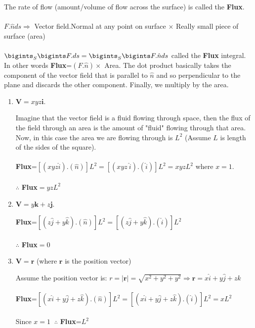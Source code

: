 \documentclass[fleqn]{article}
\begin{document}
\begin{enumerate}
      \textcolor{hwColor}{
        The rate of flow (amount/volume of flow across the surface) is called the \textbf{Flux}. \\
        \\
        $F.\hat{n} ds \Rightarrow$ Vector field.Normal at any point on surface $\times$ Really small piece of surface (area) \\ \\
        $
          \bigints_{S}\bigints F.ds=\bigints_{S} \bigints F.\hat{n} ds 
        $ called the \textbf{Flux} integral. In other words \textbf{Flux}=$(F.\hat{n}) \times$ Area. The dot product basically takes
        the component of the vector field that is parallel to $\hat{n}$ and so perpendicular to
        the plane and discards the other component. Finally, we multiply by the area. \\
      }

      \begin{enumerate}
        \item $\mathbf{V}=xyz\mathbf{i}$.

          \textcolor{hwColor}{
            Imagine that the vector field is a fluid flowing through space, then the flux of the field through an area is the amount of "fluid"
            flowing through that area. Now, in this case the area we are flowing through is $L^2$ (Assume $L$ is length of the sides of the square).
            \\
            \\
            \textbf{Flux}=$\left[(xyz \hat{i}).(\hat{n})\right] L^2=\left[(xyz ~ \hat{i}).(\hat{i})\right]L^2=xyzL^2$ where $x=1$. \\
            \\
            $\therefore$ \textbf{Flux}$=yzL^2$
          }

        \item $\mathbf{V}=y\mathbf{k}+z\mathbf{j}$.

          \textcolor{hwColor}{
            \textbf{Flux}=$\left[(z \hat{j}+y\hat{k}).(\hat{n})\right] L^2=\left[(z \hat{j}+y\hat{k}).(\hat{i})\right] L^2$ \\
            \\
            $\therefore$ \textbf{Flux}$=0$
          }

        \item $\mathbf{V}=\mathbf{r}$ (where $\mathbf{r}$ is the position vector)

          \textcolor{hwColor}{
            Assume the position vector is: $r=|\mathbf{r}|=\sqrt{x^2+y^2+y^2} \Rightarrow \mathbf{r}=x \hat{i}+y \hat{j}+z \hat{k}$ \\
            \\
            \textbf{Flux}=$\left[(x \hat{i}+y \hat{j}+z \hat{k}).(\hat{n})\right] L^2=\left[(x \hat{i}+y \hat{j}+z \hat{k}).(\hat{i})\right] L^2=x L^2$ \\
            \\
            Since $x=1 ~$ $\therefore$ \textbf{Flux}=$L^2$ 
          }


\end{enumerate}
\end{enumerate}
\end{document}
